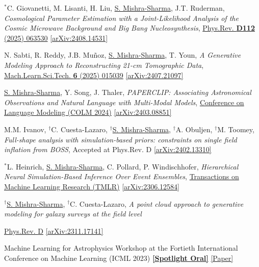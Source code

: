\documentclass[letterpaper,11pt]{article}
\newenvironment{packed_itemize}{
\begin{itemize}[label=\raisebox{0.25ex}{\tiny$\bullet$}]
  \setlength{\itemsep}{4.0pt}
  \setlength{\parskip}{0pt}
  \setlength{\parsep}{0pt}}{\end{itemize}
}
\newenvironment{packed_enumerate}[1][]{
\begin{etaremune}[#1]
  \setlength{\itemsep}{4.0pt}
  \setlength{\parskip}{0pt}
  \setlength{\parsep}{0pt}}{\end{etaremune}
}
\begin{document}
\begin{packed_enumerate}[start=56]
\item $^*$C. Giovanetti, M. Lisanti, H. Liu, \underline{S. Mishra-Sharma}, J.T. Ruderman,
\emph{Cosmological Parameter Estimation with a Joint-Likelihood Analysis of the Cosmic Microwave Background and Big Bang Nucleosynthesis},
\href{https://journals.aps.org/prd/abstract/10.1103/wspy-s948}{Phys.Rev. \textbf{D112} (2025) 063530}
\href{https://arxiv.org/abs/2408.14531}{[arXiv:2408.14531]}
  \item N. Sabti, R. Reddy, J.B. Muñoz, \underline{S. Mishra-Sharma}, T. Youn, \emph{A Generative Modeling Approach to Reconstructing 21-cm Tomographic Data}, \href{https://iopscience.iop.org/article/10.1088/2632-2153/adb19c}{Mach.Learn.Sci.Tech. \textbf{6} (2025) 015039}  \href{https://arxiv.org/abs/2407.21097}{[arXiv:2407.21097]}
  \item \underline{S. Mishra-Sharma}, Y. Song, J. Thaler, \emph{PAPERCLIP: Associating Astronomical Observations and Natural Language with Multi-Modal Models}, \href{https://colmweb.org/AcceptedPapers.html}{Conference on Language Modeling (COLM 2024)}  \href{https://arxiv.org/abs/2403.08851}{[arXiv:2403.08851]}
  \item M.M. Ivanov, $^{\dagger}$C. Cuesta-Lazaro, $^{\dagger}$\underline{S. Mishra-Sharma}, $^{\dagger}$A. Obuljen, $^{\dagger}$M. Toomey, \emph{Full-shape analysis with simulation-based priors: constraints on single field inflation from BOSS}, Accepted at Phys.Rev. {D} \href{https://arxiv.org/abs/2402.13310}{[arXiv:2402.13310]}
  \item $^*$L. Heinrich, \underline{S. Mishra-Sharma}, C. Pollard, P. Windischhofer, \emph{Hierarchical Neural Simulation-Based Inference Over Event Ensembles}, \href{https://openreview.net/forum?id=Jy2IgzjoFH&referrer=%5BAuthor%20Console%5D(%2Fgroup%3Fid%3DTMLR%2FAuthors%23your-submissions)}{Transactions on Machine Learning Research (TMLR)} \href{https://arxiv.org/abs/2306.12584}{[arXiv:2306.12584]}
  \item $^{\dagger}$\underline{S. Mishra-Sharma}, $^{\dagger}$C. Cuesta-Lazaro, \emph{A point cloud approach to generative modeling for galaxy surveys at the field level}
  \begin{packed_itemize}
      \item  \href{https://journals.aps.org/prd/abstract/10.1103/PhysRevD.109.123531}{Phys.Rev. {D}} \href{https://arxiv.org/abs/2311.17141}{[arXiv:2311.17141]}
      \item {Machine Learning for Astrophysics Workshop at the Fortieth International Conference on Machine Learning (ICML 2023)} \href{https://ml4astro.github.io/icml2023/}{\textbf{[Spotlight Oral]}} \href{https://ml4astro.github.io/icml2023/assets/59.pdf}{[Paper]} 

\end{packed_itemize}
\end{packed_enumerate}
\end{document}
